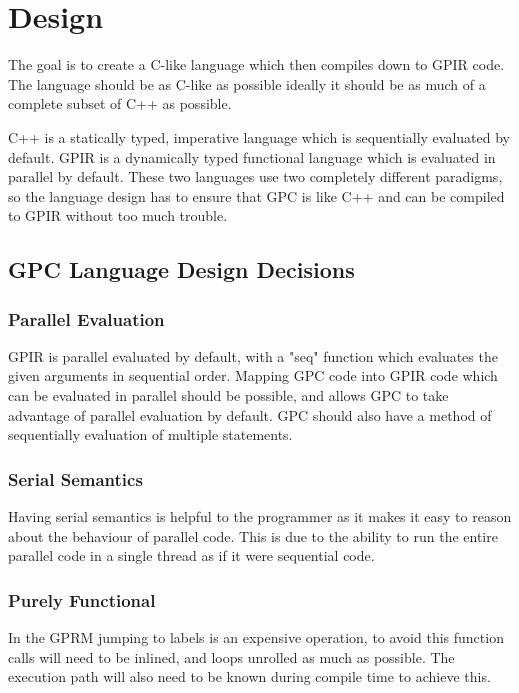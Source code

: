 \chapter{Design}

The goal is to create a C-like language which then compiles down to GPIR code.
The language should be as C-like as possible ideally it should be as much
of a complete subset of C++ as possible.

C++ is a statically typed, imperative language which is sequentially evaluated by default.
GPIR is a dynamically typed functional language which is evaluated in parallel by default.
These two languages use two completely different paradigms, so the language design has to 
ensure that GPC is like C++ and can be compiled to GPIR without too much trouble.

\section{GPC Language Design Decisions}

\subsection{Parallel Evaluation}
GPIR is parallel evaluated by default, with a "seq" function which
evaluates the given arguments in sequential order. Mapping GPC code into
GPIR code which can be evaluated in parallel should be possible, and allows
GPC to take advantage of parallel evaluation by default. GPC should also
have a method of sequentially evaluation of multiple statements.


\subsection{Serial Semantics}
Having serial semantics is helpful to the programmer as it makes
it easy to reason about the behaviour of parallel code.
This is due to the ability to run the entire parallel code in a single
thread as if it were sequential code. 

\subsection{Purely Functional}

In the GPRM jumping to labels is an expensive operation, to avoid
this function calls will need to be inlined, and loops unrolled 
as much as possible. The execution path will also need to be known 
during compile time to achieve this. 

